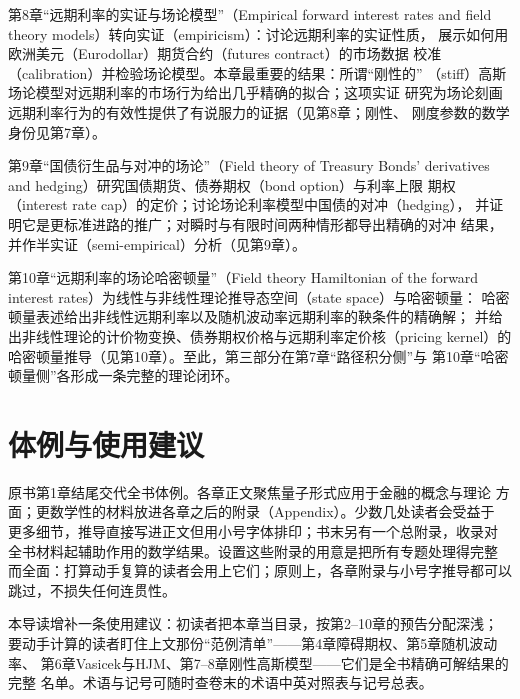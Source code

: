 第8章“远期利率的实证与场论模型”（Empirical forward interest rates and
field theory models）转向实证（empiricism）：讨论远期利率的实证性质，
展示如何用欧洲美元（Eurodollar）期货合约（futures contract）的市场数据
校准（calibration）并检验场论模型。本章最重要的结果：所谓“刚性的”
（stiff）高斯场论模型对远期利率的市场行为给出几乎精确的拟合；这项实证
研究为场论刻画远期利率行为的有效性提供了有说服力的证据（见第8章；刚性、
刚度参数的数学身份见第7章）。

第9章“国债衍生品与对冲的场论”（Field theory of Treasury Bonds'
derivatives and hedging）研究国债期货、债券期权（bond option）与利率上限
期权（interest rate cap）的定价；讨论场论利率模型中国债的对冲（hedging），
并证明它是更标准进路的推广；对瞬时与有限时间两种情形都导出精确的对冲
结果，并作半实证（semi-empirical）分析（见第9章）。

第10章“远期利率的场论哈密顿量”（Field theory Hamiltonian of the forward
interest rates）为线性与非线性理论推导态空间（state space）与哈密顿量：
哈密顿量表述给出非线性远期利率以及随机波动率远期利率的鞅条件的精确解；
并给出非线性理论的计价物变换、债券期权价格与远期利率定价核（pricing
kernel）的哈密顿量推导（见第10章）。至此，第三部分在第7章“路径积分侧”与
第10章“哈密顿量侧”各形成一条完整的理论闭环。

\section{体例与使用建议}

原书第1章结尾交代全书体例。各章正文聚焦量子形式应用于金融的概念与理论
方面；更数学性的材料放进各章之后的附录（Appendix）。少数几处读者会受益于
更多细节，推导直接写进正文但用小号字体排印；书末另有一个总附录，收录对
全书材料起辅助作用的数学结果。设置这些附录的用意是把所有专题处理得完整
而全面：打算动手复算的读者会用上它们；原则上，各章附录与小号字推导都可以
跳过，不损失任何连贯性。

本导读增补一条使用建议：初读者把本章当目录，按第2--10章的预告分配深浅；
要动手计算的读者盯住上文那份“范例清单”——第4章障碍期权、第5章随机波动率、
第6章Vasicek与HJM、第7--8章刚性高斯模型——它们是全书精确可解结果的完整
名单。术语与记号可随时查卷末的术语中英对照表与记号总表。

